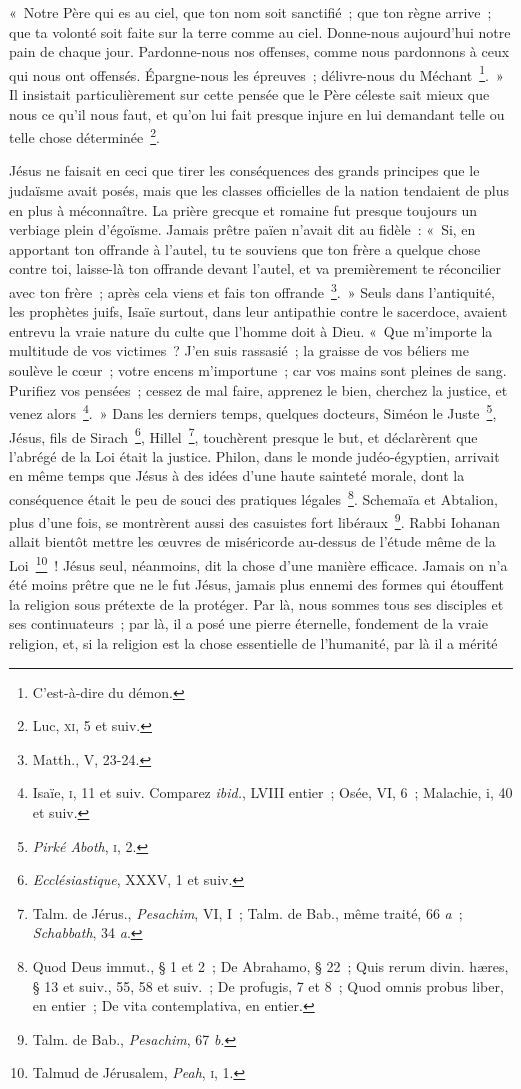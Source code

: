 \documentclass[french,twoside]{book} %
\begin{document}
« Notre Père qui es au ciel, que ton nom soit sanctifié ; que ton règne arrive ; que ta volonté soit faite sur la terre comme au ciel. Donne-nous aujourd’hui notre pain de chaque jour. Pardonne-nous nos offenses, comme nous pardonnons à ceux qui nous ont offensés. Épargne-nous les épreuves ; délivre-nous du Méchant \footnote{C’est-à-dire du démon.}. » Il insistait particulièrement sur cette pensée que le Père céleste sait mieux que nous ce qu’il nous faut, et qu’on lui fait presque injure en lui demandant telle ou telle chose déterminée \footnote{ Luc, \textsc{xi}, 5 et suiv.}.\par
Jésus ne faisait en ceci que tirer les conséquences des grands principes que le judaïsme avait posés, mais que les classes officielles de la nation tendaient de plus en plus à méconnaître. La prière grecque et romaine fut presque toujours un verbiage plein d’égoïsme. Jamais prêtre païen n’avait dit au fidèle : « Si, en apportant ton offrande à l’autel, tu te souviens que ton frère a quelque chose contre toi, laisse-là ton offrande devant l’autel, et va premièrement te réconcilier avec ton frère ; après cela viens et fais ton offrande \footnote{Matth., V, 23-24.}. » Seuls dans l’antiquité, les prophètes juifs, Isaïe surtout, dans leur antipathie contre le sacerdoce, avaient entrevu la vraie nature du culte que l’homme doit à Dieu. « Que m’importe la multitude de vos victimes ? J’en suis rassasié ; la graisse de vos béliers me soulève le cœur ; votre encens m’importune ; car vos mains sont pleines de sang. Purifiez vos pensées ; cessez de mal faire, apprenez le bien, cherchez la justice, et venez alors \footnote{ Isaïe, \textsc{i}, 11 et suiv. Comparez {\itshape ibid.}, LVIII entier ; Osée, VI, 6 ; Malachie, i, 40 et suiv.}. » Dans les derniers temps, quelques docteurs, Siméon le Juste \footnote{{\itshape Pirké Aboth}, \textsc{i}, 2.}, Jésus, fils de Sirach \footnote{{\itshape Ecclésiastique}, XXXV, 1 et suiv.}, Hillel \footnote{ Talm. de Jérus., {\itshape Pesachim}, VI, I ; Talm. de Bab., même traité, 66 {\itshape a} ; {\itshape Schabbath}, 34 {\itshape a}.}, touchèrent presque le but, et déclarèrent que l’abrégé de la Loi était la justice. Philon, dans le monde judéo-égyptien, arrivait en même temps que Jésus à des idées d’une haute sainteté morale, dont la conséquence était le peu de souci des pratiques légales \footnote{ Quod Deus immut., § 1 et 2 ; De Abrahamo, § 22 ; Quis rerum divin. hæres, § 13 et suiv., 55, 58 et suiv. ; De profugis, 7 et 8 ; Quod omnis probus liber, en entier ; De vita contemplativa, en entier.}. Schemaïa et Abtalion, plus d’une fois, se montrèrent aussi des casuistes fort libéraux \footnote{ Talm. de Bab., {\itshape Pesachim}, 67 {\itshape b}.}. Rabbi Iohanan allait bientôt mettre les œuvres de miséricorde au-dessus de l’étude même de la Loi \footnote{ Talmud de Jérusalem, {\itshape Peah}, \textsc{i}, 1.} ! Jésus seul, néanmoins, dit la chose d’une manière efficace. Jamais on n’a été moins prêtre que ne le fut Jésus, jamais plus ennemi des formes qui étouffent la religion sous prétexte de la protéger. Par là, nous sommes tous ses disciples et ses continuateurs ; par là, il a posé une pierre éternelle, fondement de la vraie religion, et, si la religion est la chose essentielle de l’humanité, par là il a mérité 
\end{document}
